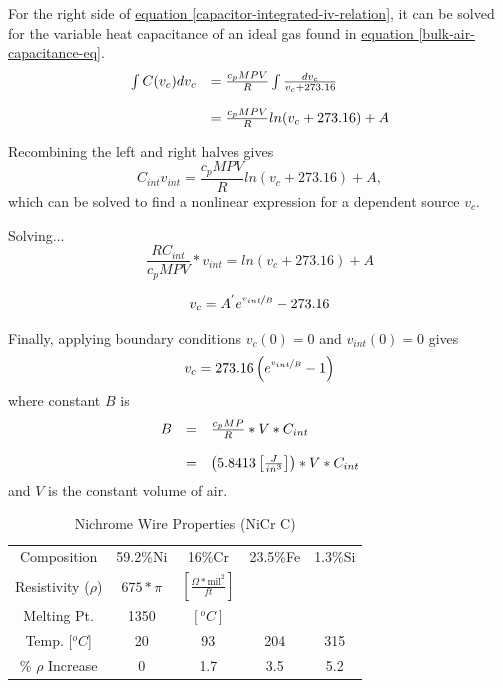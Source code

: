 \documentclass[10pt, twocolumn]{article}
\begin{document}
For the right side of
\hyperref[capacitor-integrated-iv-relation]
{equation \ref{capacitor-integrated-iv-relation}},
it can be solved for the variable heat capacitance
of an ideal gas found in
\hyperref[bulk-air-capacitance-eq]{equation \ref{bulk-air-capacitance-eq}}.
\begin{equation*}
\begin{array}{c l}
\int C(v_{c})dv_{c}	&=\frac{c_{p}MPV}{R}\int\frac{dv_{c}}{v_{c}+273.16}	\\
&\\
&=\frac{c_{p}MPV}{R}ln(v_{c}+273.16)+A	\\
\end{array}
\end{equation*}

Recombining the left and right halves gives
\begin{equation*}
C_{int}v_{int}=\frac{c_{p}MPV}{R}ln(v_{c}+273.16)+A,
\end{equation*}
which can be solved to find a nonlinear expression
for a dependent source $v_{c}$.

Solving...
\begin{equation*}
\frac{RC_{int}}{c_{p}MPV}*v_{int}=ln(v_{c}+273.16)+A
\end{equation*}

\begin{equation*}
v_{c}=A^{'}e^{\nicefrac{v_{int}}{B}}-273.16
\end{equation*}

Finally, applying boundary conditions $v_{c}(0)=0$ and $v_{int}(0)=0$ gives
\begin{equation}
v_{c}=273.16\left(e^{\nicefrac{v_{int}}{B}}-1\right)
\end{equation}
where constant $B$ is
\begin{equation}
\begin{array}{c c l}
B&=&\frac{c_{p}MP}{R}*V*C_{int}\\
&&\\
&=&\left(5.8413\left[\frac{J}{in^{3}}\right]\right)*V*C_{int}\\
\end{array}
\end{equation}
and $V$ is the constant volume of air.

\begin{table}
	\centering
	\caption{Nichrome Wire Properties (NiCr C)}
	\begin{tabular}{c | c | c | c | c}
\hline
Composition	&59.2\%Ni	&16\%Cr	&23.5\%Fe	&1.3\%Si	\\
Resistivity ($\rho$)	&$675*\pi$	&$\left[\frac{\Omega*\textrm{mil}^{2}}{ft}\right]$	&	&	\\
Melting Pt.	&1350	&$[^{o}C]$	&	&	\\
\hline\hline
Temp. [$^{o}C$]	&20	&93	&204	&315	\\
\% $\rho$ Increase	&0	&1.7	&3.5	&5.2	\\
\hline
	\end{tabular}
\end{table}
\end{document}
